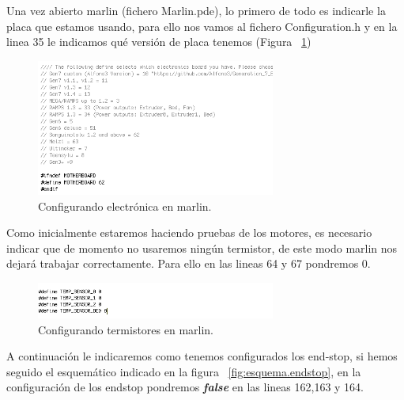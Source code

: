 		Una vez abierto marlin (fichero Marlin.pde), lo primero de todo es indicarle la placa que estamos usando, para ello nos vamos al fichero Configuration.h y en la linea 35 le indicamos qué versión de placa tenemos (Figura ~\ref{fig:sanguino.marlin})\\
		\begin{figure}[H]
			\centering
			\includegraphics[width=0.7\textwidth]{../../Fotos/26.png}
			\caption{Configurando electrónica en marlin.}
			\label{fig:sanguino.marlin}
		\end {figure}
		Como inicialmente estaremos haciendo pruebas de los motores, es necesario indicar que de momento no usaremos ningún termistor, de este modo marlin nos dejará trabajar correctamente. Para ello en las lineas 64 y 67 pondremos 0.
		\begin{figure}[H]
			\centering
			\includegraphics[width=0.7\textwidth]{../../Fotos/28.png}
			\caption{Configurando termistores en marlin.}
			\label{fig:termistor1.marlin}
		\end {figure}
A continuación le indicaremos como tenemos configurados los end-stop, si hemos seguido el esquemático indicado en la figura ~\ref{fig:esquema.endstop}, en la configuración de los endstop pondremos \textbf{\emph{false}} en las lineas 162,163 y 164.

